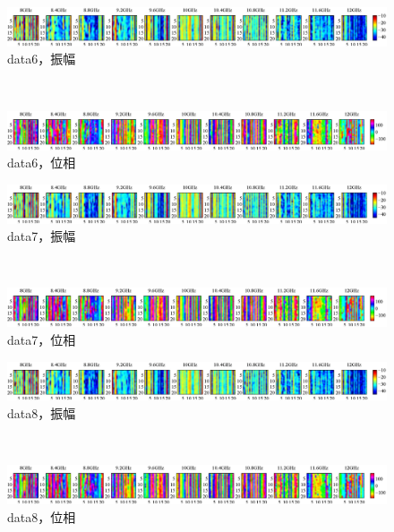 ﻿\documentclass[12pt,oneside]{jsbook}
\begin{document}
\begin{figure}[hbtp]
 \begin{center}
     \begin{minipage}[c]{\hsize}
\includegraphics[width = \hsize ]{20150204_mine6_raw_a.eps}
\centering\textmd{data6，振幅}
  \end{minipage}
\\
     \begin{minipage}[c]{\hsize}
\includegraphics[width =\hsize ]{20150204_mine6_raw_p.eps}
\centering\textmd{data6，位相}
  \end{minipage}
\end{center}
\end{figure}
\begin{figure}[hbtp]
 \begin{center}
     \begin{minipage}[c]{\hsize}
\includegraphics[width = \hsize ]{20150204_mine7_raw_a.eps}
\centering\textmd{data7，振幅}
  \end{minipage}
\\
     \begin{minipage}[c]{\hsize}
\includegraphics[width =\hsize ]{20150204_mine7_raw_p.eps}
\centering\textmd{data7，位相}
  \end{minipage}
\end{center}
\end{figure}
\begin{figure}[hbtp]
 \begin{center}
     \begin{minipage}[c]{\hsize}
\includegraphics[width = \hsize ]{20150204_mine8_raw_a.eps}
\centering\textmd{data8，振幅}
  \end{minipage}
\\
     \begin{minipage}[c]{\hsize}
\includegraphics[width =\hsize ]{20150204_mine8_raw_p.eps}
\centering\textmd{data8，位相}
  \end{minipage}
\end{center}
\end{figure}
\end{document}
